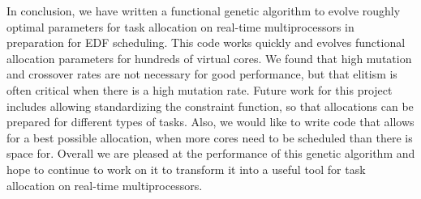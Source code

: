 \documentclass[11pt]{article}
\begin{document}
In conclusion, we have written a functional genetic algorithm to evolve roughly optimal parameters for task allocation on real-time multiprocessors in preparation for EDF scheduling. This code works quickly and evolves functional allocation parameters for hundreds of virtual cores. We found that high mutation and crossover rates are not necessary for good performance, but that elitism is often critical when there is a high mutation rate. Future work for this project includes allowing standardizing the constraint function, so that allocations can be prepared for different types of tasks. Also, we would like to write code that allows for a best possible allocation, when more cores need to be scheduled than there is space for. Overall we are pleased at the performance of this genetic algorithm and hope to continue to work on it to transform it into a useful tool for task allocation on real-time multiprocessors.

\singlespacing


\end{document}
